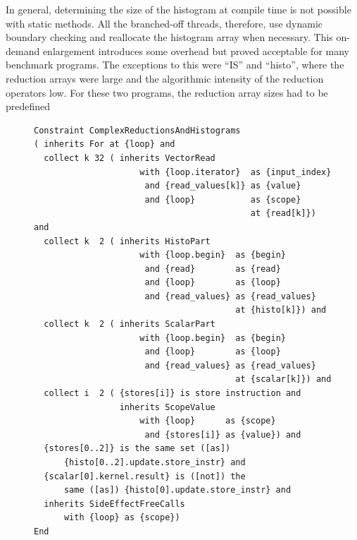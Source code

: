    {In general, determining the size of the histogram at compile time is not
    possible with static methods.
    All the branched-off threads, therefore, use dynamic boundary checking and
    reallocate the histogram array when necessary.
    This on-demand enlargement introduces some overhead but proved acceptable
    for many benchmark programs.
    The exceptions to this were ``IS'' and ``histo'', where the reduction arrays
    were large and the algorithmic intensity of the reduction operators low.
    For these two programs, the reduction array sizes had to be predefined
    \unskip\parfillskip 0pt\par}
    \newpage

\begin{figure}[H]
\begin{lstlisting}[language=IDL,label={IDLcomplexred},caption=
   {Complex Reduction and Histogram Computations (CReHCs) as IDL specification:
    The idiom comprises histogram (lines 8--13) and scalar (lines 14--18) reductions contained in a for-loop (line 2).
    These computations accumulate the values from the input array (lines 3--7).
    Additional conditions guarantee the absence of any further side effects in the loop (lines 19--28).}]
Constraint ComplexReductionsAndHistograms
( inherits For at {loop} and
  collect k 32 ( inherits VectorRead
                     with {loop.iterator}  as {input_index}
                      and {read_values[k]} as {value}
                      and {loop}           as {scope}
                                           at {read[k]}) and
  collect k  2 ( inherits HistoPart
                     with {loop.begin}  as {begin}
                      and {read}        as {read}
                      and {loop}        as {loop}
                      and {read_values} as {read_values}
                                        at {histo[k]}) and
  collect k  2 ( inherits ScalarPart
                     with {loop.begin}  as {begin}
                      and {loop}        as {loop}
                      and {read_values} as {read_values}
                                        at {scalar[k]}) and
  collect i  2 ( {stores[i]} is store instruction and
                 inherits ScopeValue
                     with {loop}      as {scope}
                      and {stores[i]} as {value}) and
  {stores[0..2]} is the same set ([as])
      {histo[0..2].update.store_instr} and
  {scalar[0].kernel.result} is ([not]) the
      same ([as]) {histo[0].update.store_instr} and
  inherits SideEffectFreeCalls
      with {loop} as {scope})
End
\end{lstlisting}
\end{figure}

